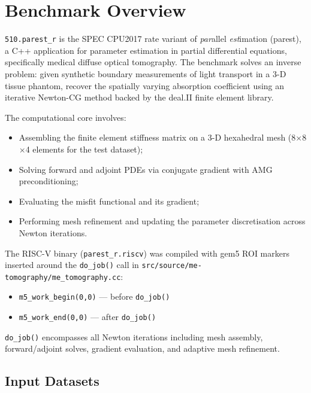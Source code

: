 \documentclass[conference]{IEEEtran}
\begin{document}
\section{Benchmark Overview}

\texttt{510.parest\_r} is the SPEC CPU2017 rate variant of
\emph{par}allel \emph{est}imation (parest), a C++ application for
parameter estimation in partial differential equations, specifically
medical diffuse optical tomography. The benchmark solves an
inverse problem: given synthetic boundary measurements of light
transport in a 3-D tissue phantom, recover the spatially varying
absorption coefficient using an iterative Newton-CG method backed
by the deal.II finite element library.

The computational core involves:
\begin{itemize}
    \item Assembling the finite element stiffness matrix on a
          3-D hexahedral mesh (8$\times$8$\times$4 elements for the
          test dataset);
    \item Solving forward and adjoint PDEs via conjugate gradient
          with AMG preconditioning;
    \item Evaluating the misfit functional and its gradient;
    \item Performing mesh refinement and updating the parameter
          discretisation across Newton iterations.
\end{itemize}

The RISC-V binary (\texttt{parest\_r.riscv}) was compiled with gem5
ROI markers inserted around the \texttt{do\_job()} call in
\texttt{src/source/me-tomography/me\_tomography.cc}:

\begin{itemize}
    \item \texttt{m5\_work\_begin(0,0)} --- before \texttt{do\_job()}
    \item \texttt{m5\_work\_end(0,0)}   --- after  \texttt{do\_job()}
\end{itemize}

\texttt{do\_job()} encompasses all Newton iterations including mesh
assembly, forward/adjoint solves, gradient evaluation, and adaptive
mesh refinement.

\subsection{Input Datasets}
\end{document}

